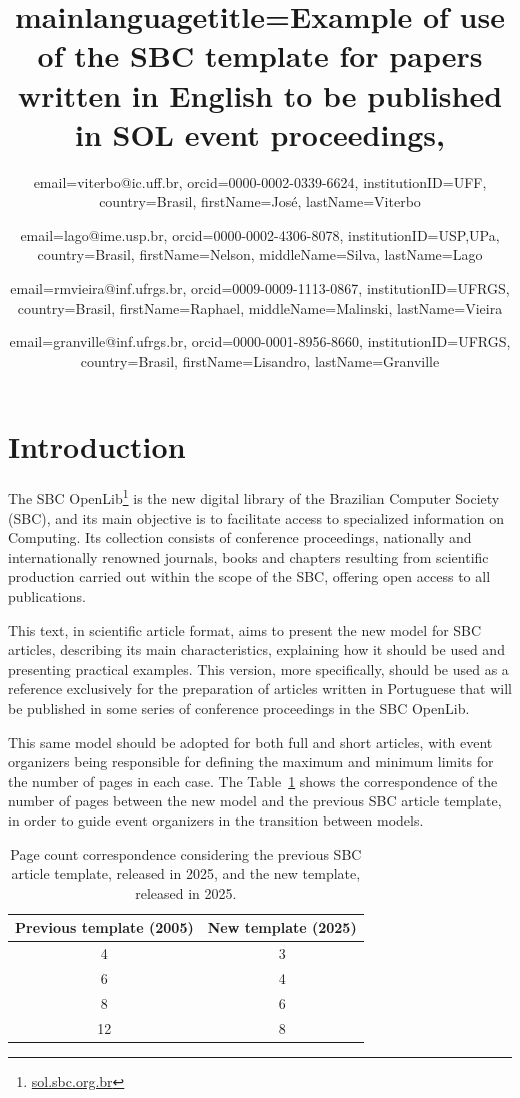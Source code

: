 \documentclass[english,notblind]{sbc20}
\title
  {
    mainlanguagetitle={Example of use of the SBC template for papers written in English to be published in SOL event proceedings},
  }
\author
  {
    email=viterbo@ic.uff.br,
    orcid=0000-0002-0339-6624, %
    institutionID=UFF,
    country=Brasil,
    firstName=José,
    lastName=Viterbo 
  }
\author
  {
    email=lago@ime.usp.br,
    orcid=0000-0002-4306-8078,
    institutionID={USP,UPa},
    country=Brasil,
    firstName=Nelson,
    middleName=Silva,
    lastName=Lago
  }
\author
  {
    email=rmvieira@inf.ufrgs.br,
    orcid=0009-0009-1113-0867,
    institutionID={UFRGS},
    country=Brasil,
    firstName=Raphael,
    middleName=Malinski,
    lastName=Vieira
  }
\author
  {
    email=granville@inf.ufrgs.br,
    orcid=0000-0001-8956-8660,
    institutionID=UFRGS,
    country=Brasil,
    firstName=Lisandro,
    lastName=Granville
  }
\begin{document}
\maketitle

\section{Introduction}
\label{sec:intro}

The SBC OpenLib\footnote{\url{sol.sbc.org.br}} is the new digital library of the Brazilian Computer Society (SBC), and its main objective is to facilitate access to specialized information on Computing. Its collection consists of conference proceedings, nationally and internationally renowned journals, books and chapters resulting from scientific production carried out within the scope of the SBC, offering open access to all publications.

This text, in scientific article format, aims to present the new model for SBC articles, describing its main characteristics, explaining how it should be used and presenting practical examples. This version, more specifically, should be used as a reference exclusively for the preparation of articles written in Portuguese that will be published in some series of conference proceedings in the SBC OpenLib.

This same model should be adopted for both full and short articles, with event organizers being responsible for defining the maximum and minimum limits for the number of pages in each case. The Table~\ref{tab:equivalence} shows the correspondence of the number of pages between the new model and the previous SBC article template, in order to guide event organizers in the transition between models.

\begin{table}[!hb]
\centering
\begin{tabular}{@{}cc@{}}
\toprule
Previous template (2005) & New template (2025) \\
\midrule
 4  & 3 \\
 6  & 4 \\
 8  & 6 \\
 12  & 8 \\
\bottomrule
\end{tabular}
\caption{Page count correspondence considering the previous SBC article template, released in 2025, and the new template, released in 2025.\label{tab:equivalence}}
\end{table}
\end{document}

